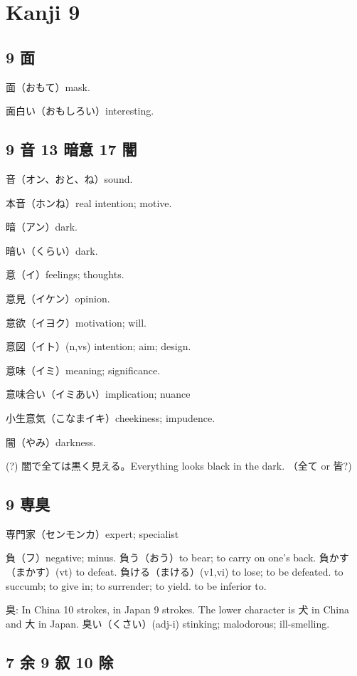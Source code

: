 \chapter{Kanji 9}

\section{9 面}

面（おもて）mask.

面白い（おもしろい）interesting.

\section{9 音 13 暗意 17 闇}

音（オン、おと、ね）sound.

本音（ホンね）real intention; motive.

暗（アン）dark.

暗い（くらい）dark.

意（イ）feelings; thoughts.

意見（イケン）opinion.

意欲（イヨク）motivation; will.

意図（イト）(n,vs) intention; aim; design.

意味（イミ）meaning; significance.

意味合い（イミあい）implication; nuance

小生意気（こなまイキ）cheekiness; impudence.

闇（やみ）darkness.

(?) 闇で全ては黒く見える。Everything looks black in the dark.
（全て or 皆?)

\section{9 専臭}

専門家（センモンカ）expert; specialist

負（フ）negative; minus.
負う（おう）to bear; to carry on one's back.
負かす（まかす）(vt) to defeat.
負ける（まける）(v1,vi)
to lose; to be defeated.
to succumb; to give in; to surrender; to yield.
to be inferior to.

臭: In China 10 strokes, in Japan 9 strokes.
The lower character is 犬 in China and 大 in Japan.
臭い（くさい）(adj-i) stinking; malodorous; ill-smelling.

\section{7 余 9 叙 10 除}

